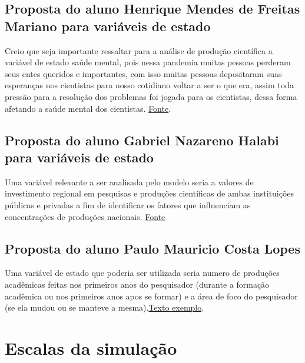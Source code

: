 \subsection{Proposta do aluno Henrique Mendes de Freitas Mariano para variáveis de estado}
Creio que seja importante ressaltar para a análise de produção científica a variável de estado saúde mental, pois nessa pandemia muitas pessoas perderam seus entes queridos e importantes, com isso muitas pessoas depositaram suas esperanças nos cientistas para nosso cotidiano voltar a ser o que era, assim toda pressão para a resolução dos problemas foi jogada para os cientistas, dessa forma afetando a saúde mental dos cientistas. \href{https://bioinfo.imd.ufrn.br/transcricaoemdia/opiniao/eg-010}{Fonte}.

\subsection{Proposta do aluno Gabriel Nazareno Halabi para variáveis de estado}

Uma variável relevante a ser analisada pelo modelo seria a valores de investimento regional em pesquisas e produções científicas de ambas instituições públicas e privadas a fim de identificar os fatores que influenciam as concentrações de produções nacionais. \href{https://jornal.usp.br/universidade/levantamento-mostra-quem-financia-a-pesquisa-no-brasil-e-na-usp/}{Fonte}

\subsection{Proposta do aluno Paulo Mauricio Costa Lopes}
Uma variável de estado que poderia ser utilizada seria numero de produções acadêmicas feitas nos primeiros anos do pesquisador (durante a formação acadêmica ou nos primeiros anos apos se formar) e a área de foco do pesquisador (se ela mudou ou se manteve a mesma).\href{https://periodicoscientificos.ufmt.br/ojs/index.php/repad/article/view/8571/6115}{Texto exemplo}.


\section{Escalas da simulação}

